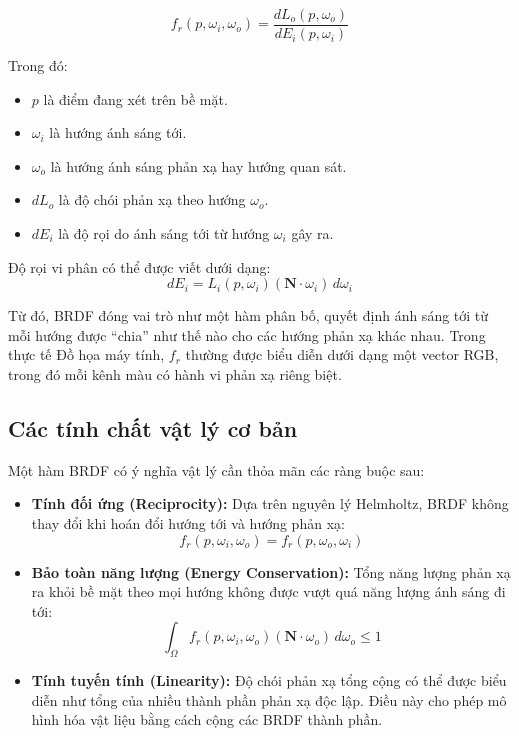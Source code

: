 \begin{equation}
	f_r(p, \omega_i, \omega_o) = \frac{dL_o(p, \omega_o)}{dE_i(p, \omega_i)}
\end{equation}

Trong đó:
\begin{itemize}
	\item $p$ là điểm đang xét trên bề mặt.
	\item $\omega_i$ là hướng ánh sáng tới.
	\item $\omega_o$ là hướng ánh sáng phản xạ hay hướng quan sát.
	\item $dL_o$ là độ chói phản xạ theo hướng $\omega_o$.
	\item $dE_i$ là độ rọi do ánh sáng tới từ hướng $\omega_i$ gây ra.
\end{itemize}

Độ rọi vi phân có thể được viết dưới dạng:
\begin{equation}
	dE_i = L_i(p, \omega_i) (\mathbf{N} \cdot \omega_i) \, d\omega_i
\end{equation}

Từ đó, BRDF đóng vai trò như một hàm phân bố, quyết định ánh sáng tới từ mỗi hướng được “chia” như thế nào cho các hướng phản xạ khác nhau. Trong thực tế Đồ họa máy tính, $f_r$ thường được biểu diễn dưới dạng một vector RGB, trong đó mỗi kênh màu có hành vi phản xạ riêng biệt.

\subsection{Các tính chất vật lý cơ bản}

Một hàm BRDF có ý nghĩa vật lý cần thỏa mãn các ràng buộc sau:

\begin{itemize}
	\item \textbf{Tính đối ứng (Reciprocity):} Dựa trên nguyên lý Helmholtz, BRDF không thay đổi khi hoán đổi hướng tới và hướng phản xạ:
	\begin{equation}
		f_r(p, \omega_i, \omega_o) = f_r(p, \omega_o, \omega_i)
	\end{equation}
	
	\item \textbf{Bảo toàn năng lượng (Energy Conservation):} Tổng năng lượng phản xạ ra khỏi bề mặt theo mọi hướng không được vượt quá năng lượng ánh sáng đi tới:
	\begin{equation}
		\int_{\Omega} f_r(p, \omega_i, \omega_o) (\mathbf{N} \cdot \omega_o) \, d\omega_o \le 1
	\end{equation}
	
	\item \textbf{Tính tuyến tính (Linearity):} Độ chói phản xạ tổng cộng có thể được biểu diễn như tổng của nhiều thành phần phản xạ độc lập. Điều này cho phép mô hình hóa vật liệu bằng cách cộng các BRDF thành phần.
\end{itemize}

